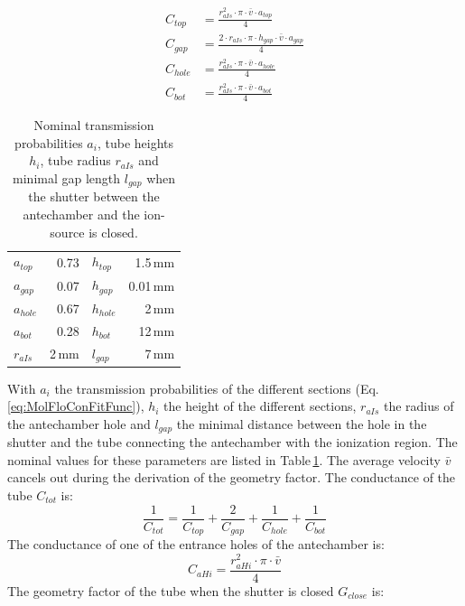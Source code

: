 		\begin{align}
			C_{top}  &= \frac{r_{aIs}^2\cdot\pi\cdot\bar{v}\cdot a_{top}}{4}\\
			C_{gap}  &= \frac{2\cdot r_{aIs}\cdot \pi \cdot h_{gap}\cdot\bar{v}\cdot a_{gap}}{4}\\
			C_{hole} &= \frac{r_{aIs}^2\cdot\pi\cdot\bar{v}\cdot a_{hole}}{4}\\
			C_{bot}  &= \frac{r_{aIs}^2\cdot\pi\cdot\bar{v}\cdot a_{bot}}{4}
		\end{align}
		\begin{table}[h]
			\begin{center}
				\begin{tabular}{l r| l r }
					$a_{top}$	& 0.73 	& $h_{top}$		& 1.5\,mm	\\
					$a_{gap}$	& 0.07 	& $h_{gap}$		& 0.01\,mm \\
					$a_{hole}$ 	& 0.67 	& $h_{hole}$ 	& 2\,mm\\
					$a_{bot}$ 	& 0.28 	& $h_{bot}$ 	& 12\,mm\\
					$r_{aIs}$ 	& 2\,mm & $l_{gap}$ 	& 7\,mm\\
				\end{tabular}
			\end{center}
			\caption{Nominal transmission probabilities $a_i$, tube heights $h_i$, tube radius $r_{aIs}$ and minimal gap length $l_{gap}$ when the shutter between the antechamber and the ion-source is closed.}
			\label{tab:thMolFloConMotClosPara}
		\end{table}
		With $a_{i}$ the transmission probabilities of the different sections (Eq.\,\eqref{eq:MolFloConFitFunc}), $h_i$ the height of the different sections, $r_{aIs}$ the radius of the antechamber hole and $l_{gap}$ the minimal distance between the hole in the shutter and the tube connecting the antechamber with the ionization region. The nominal values for these parameters are listed in Table\,\ref{tab:thMolFloConMotClosPara}. The average velocity $\bar{v}$ cancels out during the derivation of the geometry factor. The conductance of the tube $C_{tot}$ is:
		\begin{equation}
			\frac{1}{C_{tot}} = \frac{1}{C_{top}} + \frac{2}{C_{gap}} + \frac{1}{C_{hole}} + \frac{1}{C_{bot}}
		\end{equation}
		The conductance of one of the entrance holes of the antechamber is:
		\begin{equation}
			C_{aHi} = \frac{r_{aHi}^2\cdot\pi\cdot\bar{v}}{4}
		\end{equation}
		The geometry factor of the tube when the shutter is closed $G_{close}$ is:
